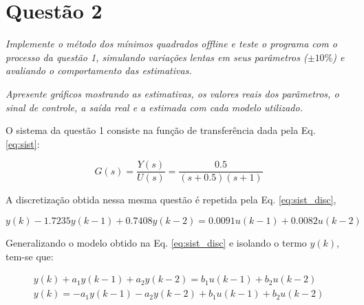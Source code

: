 

\chapter*{Questão 2}

{\it Implemente o método dos mínimos quadrados offline e teste o programa com o
processo da questão 1, simulando variações lentas em seus parâmetros ($\pm
10\%$) e avaliando o comportamento das estimativas.}

{\it Apresente gráficos mostrando as estimativas, os valores reais dos
parâmetros, o sinal de controle, a saída real e a estimada com cada modelo
utilizado.}

\vspace{0.5cm}


\vspace{0.25cm}

O sistema da questão 1 consiste na função de transferência dada pela Eq.
\ref{eq:sist}:

\begin{equation}\label{eq:sist}
G(s) = \frac{Y(s)}{U(s)} = \frac{0.5}{(s + 0.5)(s + 1)}
\end{equation}

A discretização obtida nessa mesma questão é repetida pela Eq.
\ref{eq:sist_disc},

\begin{equation}\label{eq:sist_disc}
y(k) - 1.7235y(k-1) + 0.7408y(k-2) = 0.0091u(k-1) + 0.0082u(k-2)
\end{equation}

Generalizando o modelo obtido na Eq. \ref{eq:sist_disc} e isolando o termo
$y(k)$, tem-se que:

\begin{eqnarray}
y(k) + a_1 y(k-1) + a_2 y(k-2) = b_1 u(k-1) + b_2 u(k-2)\nonumber\\
y(k) = - a_1 y(k-1) - 
         a_2 y(k-2) + 
         b_1 u(k-1) + 
         b_2u(k-2)\label{eq:eq_a_dif_geral}
\end{eqnarray}

